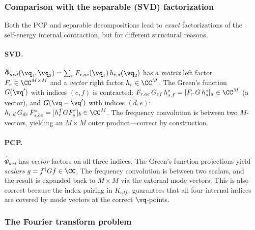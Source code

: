 \subsubsection{Comparison with the separable (SVD) factorization}
\label{sssub:pcp_vs_svd_structure}

Both the PCP and separable decompositions lead to \emph{exact}
factorizations of the self-energy internal contraction, but for
different structural reasons.

\paragraph{SVD.}
$\hat\Phi_{acd}(\vq_1,\vq_2) = \sum_r F_{r,ac}(\vq_1)\,h_{r,d}(\vq_2)$
has a \emph{matrix} left factor $F_r \in \CC^{M\times M}$ and a
\emph{vector} right factor $h_r \in \CC^M$.  The Green's function
$G(\vq')$ with indices $(c,f)$ is contracted:
$F_{r,ac}\,G_{cf}\,h^*_{s,f} = [F_r\,G\,h_s^*]_a \in \CC^M$
(a vector), and $G(\vq-\vq')$ with indices $(d,e)$:
$h_{r,d}\,G_{de}\,F^*_{s,be} = [h_r^T G F_s^\dagger]_b \in \CC^M$.
The frequency convolution is between two $M$-vectors, yielding
an $M \times M$ outer product---correct by construction.

\paragraph{PCP.}
$\hat\Phi_{acd}$ has \emph{vector} factors on all three indices.
The Green's function projections yield \emph{scalars}
$g = f^\dagger G f \in \CC$.  The frequency convolution is between
two scalars, and the result is expanded back to $M \times M$ via
the external mode vectors.  This is also correct because the
index pairing in $K_{cdfe}$ guarantees that all four internal
indices are covered by mode vectors at the correct $\vq$-points.


\subsubsection{The Fourier transform problem}
\label{sssub:ft_problem}


